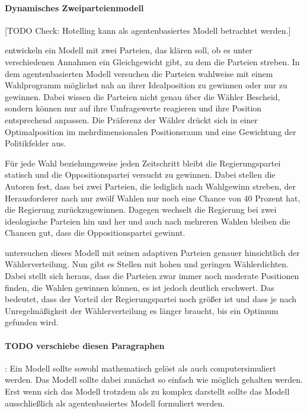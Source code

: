 \paragraph{Dynamisches Zweiparteienmodell}

[TODO Check: Hotelling kann als agentenbasiertes Modell betrachtet werden.]

\citet{kollman1992adaptive} entwickeln ein Modell mit zwei Parteien, das klären soll, ob es unter verschiedenen Annahmen ein Gleichgewicht gibt, zu dem die Parteien streben. In dem agentenbasierten Modell versuchen die Parteien wahlweise mit einem Wahlprogramm möglichst nah an ihrer Idealposition zu gewinnen oder nur zu gewinnen. Dabei wissen die Parteien nicht genau über die Wähler Bescheid, sondern können nur auf ihre Umfragewerte reagieren und ihre Position entsprechend anpassen. Die Präferenz der Wähler drückt sich in einer Optimalposition im mehrdimensionalen Positionsraum und eine Gewichtung der Politikfelder aus. 
\citep[S.\,930-1]{kollman1992adaptive}

Für jede Wahl beziehungsweise jeden Zeitschritt bleibt die Regierungspartei statisch und die Oppositionspartei versucht zu gewinnen. Dabei stellen die Autoren fest, dass bei zwei Parteien, die lediglich nach Wahlgewinn streben, der Herausforderer nach nur zwölf Wahlen nur noch eine Chance von 40 Prozent hat, die Regierung zurückzugewinnen. Dagegen wechselt die Regierung bei zwei ideologische Parteien hin und her und auch nach mehreren Wahlen bleiben die Chancen gut, dass die Oppositionspartei gewinnt. \citep[S.\,934-5]{kollman1992adaptive}

\citet{kollman1998political} untersuchen dieses Modell mit seinen adaptiven Parteien genauer hinsichtlich der Wählerverteilung. Nun gibt es Stellen mit hohen und geringen Wählerdichten. Dabei stellt sich heraus, dass die Parteien zwar immer noch moderate Positionen finden, die Wahlen gewinnen können, es ist jedoch deutlich erschwert. Das bedeutet, dass der Vorteil der Regierungspartei noch größer ist und dass je nach Unregelmäßigkeit der Wählerverteilung es länger braucht, bis ein Optimum gefunden wird. \citep{kollman1998political}

\paragraph{TODO verschiebe diesen Paragraphen}
\citet[S.\,13ff]{marchi2014ABMs}: Ein Modell sollte sowohl mathematisch gelöst als auch computersimuliert werden. Das Modell sollte dabei zunächst so einfach wie möglich gehalten werden. Erst wenn sich das Modell trotzdem als zu komplex darstellt sollte das Modell ausschließlich als agentenbasiertes Modell formuliert werden.




